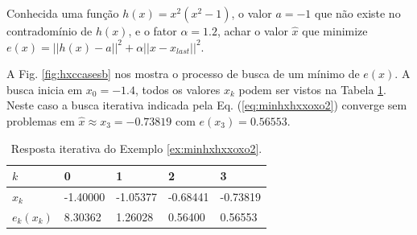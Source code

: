 \begin{example}\label{ex:minhxhxxoxo2}
Conhecida uma função $h(x)=x^2(x^2-1)$, o valor $a=-1$ que não existe no contradomínio de $h(x)$,
e o fator $\alpha=1.2$,
achar o valor $\hat{x}$ que minimize $e(x)=||h(x)-a||^2+\alpha||x-x_{last}||^2$.
\end{example}
\begin{SolutionT}\label{sol:minhxhxxoxo2}
 A Fig. \ref{fig:hxccasesb} nos mostra o processo de busca de um mínimo
 de $e(x)$. A busca inicia em $x_0=-1.4$,
 todos os valores $x_{k}$ podem ser vistos na Tabela \ref{tab:hxccases2}. 
Neste caso a busca iterativa indicada pela Eq. (\ref{eq:minhxhxxoxo2}) converge sem problemas 
em $\hat{x}\approx x_3 =-0.73819$ com $e(x_3)=0.56553$.
\end{SolutionT}

\begin{table}[!h]
\centering
\begin{tabular}{|l|l|l|l|l|}
\hline
$k$      & 0 & 1 & 2 & 3 \\ \hline
$x_k$    & -1.40000 & -1.05377 & -0.68441 & -0.73819 \\ \hline
$e_k(x_k)$ & 8.30362 &  1.26028 &  0.56400 &  0.56553 \\ \hline
\end{tabular}
\caption{Resposta iterativa do Exemplo \ref{ex:minhxhxxoxo2}.}
\label{tab:hxccases2}
\end{table}

